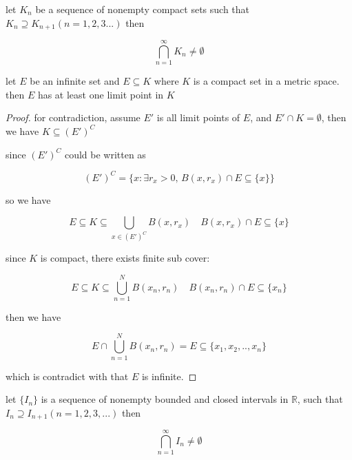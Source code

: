\begin{corollary}
    \label{col:2-3-6}
    let $K_n$ be a sequence of nonempty compact sets such that $K_n \supseteq K_{n+1}(n=1,2,3...)$
    then 

    \[
        \bigcap_{n=1}^{\infty}K_n \ne \emptyset
    \]

\end{corollary}

\begin{thm}
    \label{thm:2-3-7}
    let $E$ be an infinite set and $E \subseteq K$ where $K$ is a compact set in a metric space. 
    then $E$ has at least one limit point in $K$
\end{thm}

\begin{proof}
    for contradiction, assume  $E'$ is all limit points of $E$, and $E' \cap K = \emptyset$, then we have $K \subseteq (E')^C$

    since $(E')^C$ could be written as

    \[
        (E')^C = \{ x: \exists r_x > 0,\, B(x, r_x) \cap E \subseteq \{ x \} \}
    \]

    so we have

    \[
        E \subseteq K \subseteq \bigcup_{x \in (E')^C} B(x, r_x) \quad B(x, r_x) \cap E \subseteq \{ x \}
    \]

    since $K$ is compact, there exists finite sub cover:


    \[
        E \subseteq K \subseteq \bigcup_{n=1}^{N} B(x_n, r_n) \quad B(x_n, r_n) \cap E \subseteq \{ x_n \}
    \]

    then we have

    \[
        E \cap \bigcup_{n=1}^{N} B(x_n, r_n) = E \subseteq \{ x_1, x_2, .. , x_n \}
    \]

    which is contradict with that $E$ is infinite.
\end{proof}

\begin{thm}
    \label{lem:2-3-8}   
    let $\{ I_n \}$ is a sequence of nonempty bounded and closed intervals in $\mathbb{R}$, such that $I_n \supseteq I_{n+1}(n=1,2,3, ...)$
    then 

    \[
        \bigcap_{n=1}^{\infty} I_n \ne \emptyset
    \]
\end{thm}

